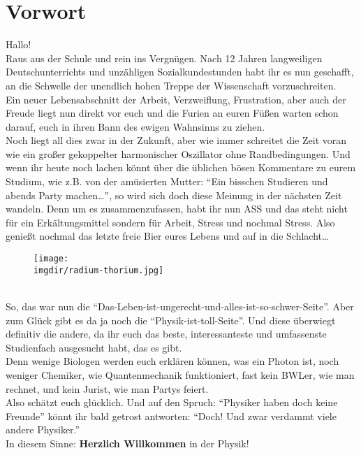 \section{Vorwort}
\hspace{0.5cm} Hallo!\\
Raus aus der Schule und rein ins Vergnügen. Nach 12 Jahren
langweiligen Deutschunterrichts und unzähligen Sozialkundestunden habt ihr es nun geschafft, an die Schwelle der unendlich hohen Treppe der Wissenschaft vorzuschreiten.\\
Ein neuer Lebensabschnitt der Arbeit, Verzweiflung, Frustration, aber auch der Freude liegt nun direkt vor euch und die Furien an euren Fü\ss en warten schon darauf, euch in ihren Bann des ewigen Wahnsinns zu ziehen.\\
Noch liegt all dies zwar in der Zukunft, aber wie immer schreitet die Zeit voran wie ein gro\ss er gekoppelter harmonischer Oszillator ohne Randbedingungen. Und wenn ihr heute noch lachen könnt über die üblichen
bösen Kommentare zu eurem Studium, wie z.B. von der amüsierten
Mutter: \enquote{Ein bisschen Studieren und abends Party machen\ldots}, so wird sich doch diese Meinung in der nächsten Zeit wandeln. Denn um es zusammenzufassen, habt ihr nun ASS und das steht nicht für ein Erkältungsmittel sondern für Arbeit, Stress und nochmal Stress. Also genießt nochmal das letzte freie Bier eures Lebens und auf in die Schlacht\ldots
\begin{figure}[b!]
	\centering
  	\texttt{[image: \\imgdir/radium-thorium.jpg]}
\end{figure}
\\So, das war nun die \enquote{Das-Leben-ist-ungerecht-und-alles-ist-so-schwer-Seite}. Aber zum Glück gibt es da ja noch die \enquote{Physik-ist-toll-Seite}. Und diese überwiegt definitiv die andere, da ihr euch das beste, interessanteste und umfassenste Studienfach ausgesucht habt, das es gibt.\\
Denn wenige Biologen werden euch erklären können, was ein Photon ist, noch weniger Chemiker, wie Quantenmechanik funktioniert, fast kein BWLer, wie man rechnet, und kein Jurist, wie man Partys feiert.\\
Also schätzt euch glücklich. Und auf den Spruch: \enquote{Physiker haben doch keine Freunde} könnt ihr bald getrost antworten: \enquote{Doch! Und zwar verdammt viele andere Physiker.}\\
In diesem Sinne: \textbf{Herzlich Willkommen} in der Physik!